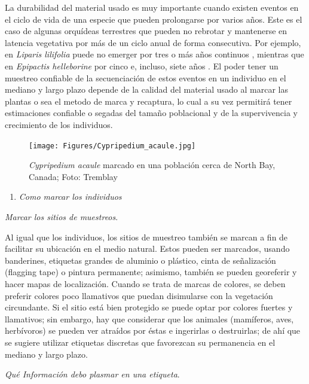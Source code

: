 \documentclass[
]{book}
\providecommand{\tightlist}{%
  \setlength{\itemsep}{0pt}\setlength{\parskip}{0pt}}
\theoremstyle{definition}
\theoremstyle{definition}
\theoremstyle{definition}
\theoremstyle{definition}
\theoremstyle{remark}
\begin{document}
La durabilidad del material usado es muy importante cuando existen eventos en el ciclo de vida de una especie que pueden prolongarse por varios años.
Este es el caso de algunas orquídeas terrestres que pueden no rebrotar y mantenerse en latencia vegetativa por más de un ciclo anual de forma consecutiva.
Por ejemplo, en \emph{Liparis lilifolia} puede no emerger por tres o más años continuos \citep{hutchings1987population, wells1991demographic}, mientras que en \emph{Epipactis helleborine} por cinco e, incluso, siete años \citetext{\citealp[ ]{light2006appearance}; \citealp{coates2006effects}}.
El poder tener un muestreo confiable de la secuenciación de estos eventos en un individuo en el mediano y largo plazo depende de la calidad del material usado al marcar las plantas o sea el metodo de marca y recaptura, lo cual a su vez permitirá tener estimaciones confiable o segadas del tamaño poblacional y de la supervivencia y crecimiento de los individuos.

\begin{figure}
\centering
\texttt{[image: Figures/Cypripedium\_acaule.jpg]}
\caption{\emph{Cypripedium acaule} marcado en una población cerca de North Bay, Canada; Foto: Tremblay}
\end{figure}

\begin{enumerate}
\def\labelenumi{\alph{enumi})}
\setcounter{enumi}{1}
\tightlist
\item
  \emph{Como marcar los individuos}
\end{enumerate}

\emph{Marcar los sitios de muestreos}.

Al igual que los individuos, los sitios de muestreo también se marcan a fin de facilitar su ubicación en el medio natural.
Estos pueden ser marcados, usando banderines, etiquetas grandes de aluminio o plástico, cinta de señalización (flagging tape) o pintura permanente; asimismo, también se pueden georeferir y hacer mapas de localización.
Cuando se trata de marcas de colores, se deben preferir colores poco llamativos que puedan disimularse con la vegetación circundante.
Si el sitio está bien protegido se puede optar por colores fuertes y llamativos; sin embargo, hay que considerar que los animales (mamíferos, aves, herbívoros) se pueden ver atraídos por éstas e ingerirlas o destruirlas; de ahí que se sugiere utilizar etiquetas discretas que favorezcan su permanencia en el mediano y largo plazo.

\emph{Qué Información debo plasmar en una etiqueta}.
\end{document}
